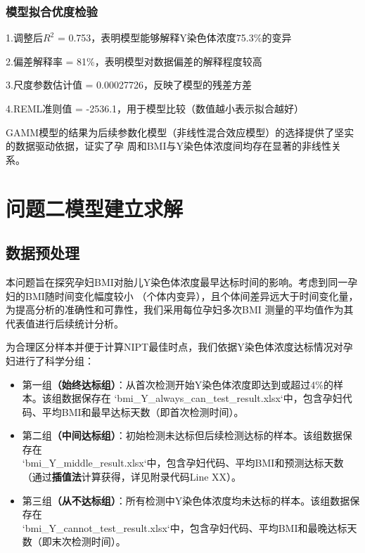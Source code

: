 \documentclass{article}
\begin{document}
\subsubsection{\textbf{模型拟合优度检验}}
1.调整后$R^2$ = 0.753，表明模型能够解释Y染色体浓度75.3\%的变异

2.偏差解释率 = 81\%，表明模型对数据偏差的解释程度较高

3.尺度参数估计值 = 0.00027726，反映了模型的残差方差

4.REML准则值 = -2536.1，用于模型比较（数值越小表示拟合越好）

GAMM模型的结果为后续参数化模型（非线性混合效应模型）的选择提供了坚实的数据驱动依据，证实了孕
周和BMI与Y染色体浓度间均存在显著的非线性关系。
\section{\textbf{问题二模型建立求解}}
\subsection{\textbf{数据预处理}}
本问题旨在探究孕妇BMI对胎儿Y染色体浓度最早达标时间的影响。考虑到同一孕妇的BMI随时间变化幅度较小
（个体内变异），且个体间差异远大于时间变化量，为提高分析的准确性和可靠性，我们采用每位孕妇多次BMI
测量的平均值作为其代表值进行后续统计分析。

为合理区分样本并便于计算NIPT最佳时点，我们依据Y染色体浓度达标情况对孕妇进行了科学分组：
\begin{itemize}
    \item 第一组\textbf{（始终达标组）}：从首次检测开始Y染色体浓度即达到或超过4\%的样本。该组数据保存在 `bmi\_Y\_always\_can\_test\_result.xlsx`中，包含孕妇代码、平均BMI和最早达标天数（即首次检测时间）。
    \item 第二组\textbf{（中间达标组）}：初始检测未达标但后续检测达标的样本。该组数据保存在 \\
          `bmi\_Y\_middle\_result.xlsx`中，包含孕妇代码、平均BMI和预测达标天数（通过\textbf{插值法}计算获得，详见附录代码Line XX）。
    \item 第三组\textbf{（从不达标组）}：所有检测中Y染色体浓度均未达标的样本。该组数据保存在 \\
          `bmi\_Y\_cannot\_test\_result.xlsx`中，包含孕妇代码、平均BMI和最晚达标天数（即末次检测时间）。
\end{itemize}
\end{document}
